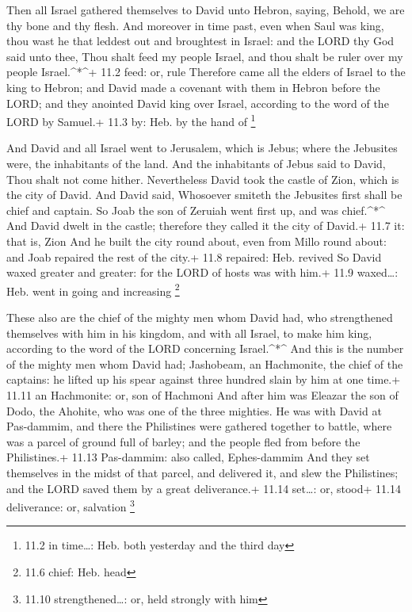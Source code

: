  Then all Israel gathered themselves to David unto Hebron,
saying, Behold, we are thy bone and thy flesh.  And moreover
in time past, even when Saul was king, thou wast he that leddest out and
broughtest in Israel: and the LORD thy God said unto thee, Thou shalt
feed my people Israel, and thou shalt be ruler over my people
Israel.\^{}*\^{}+ 11.2 feed: or, rule  Therefore came all
the elders of Israel to the king to Hebron; and David made a covenant
with them in Hebron before the LORD; and they anointed David king over
Israel, according to the word of the LORD by Samuel.+ 11.3 by: Heb. by
the hand of \footnote{11.2 in time\ldots: Heb. both yesterday and the
  third day}

 And David and all Israel went to Jerusalem, which is Jebus;
where the Jebusites were, the inhabitants of the land.  And
the inhabitants of Jebus said to David, Thou shalt not come hither.
Nevertheless David took the castle of Zion, which is the city of David.
 And David said, Whosoever smiteth the Jebusites first shall
be chief and captain. So Joab the son of Zeruiah went first up, and was
chief.\^{}*\^{}  And David dwelt in the castle; therefore
they called it the city of David.+ 11.7 it: that is, Zion 
And he built the city round about, even from Millo round about: and Joab
repaired the rest of the city.+ 11.8 repaired: Heb. revived 
So David waxed greater and greater: for the LORD of hosts was with him.+
11.9 waxed\ldots: Heb. went in going and increasing \footnote{11.6
  chief: Heb. head}

 These also are the chief of the mighty men whom David had,
who strengthened themselves with him in his kingdom, and with all
Israel, to make him king, according to the word of the LORD concerning
Israel.\^{}*\^{}  And this is the number of the mighty men
whom David had; Jashobeam, an Hachmonite, the chief of the captains: he
lifted up his spear against three hundred slain by him at one time.+
11.11 an Hachmonite: or, son of Hachmoni  And after him was
Eleazar the son of Dodo, the Ahohite, who was one of the three mighties.
 He was with David at Pas-dammim, and there the Philistines
were gathered together to battle, where was a parcel of ground full of
barley; and the people fled from before the Philistines.+ 11.13
Pas-dammim: also called, Ephes-dammim  And they set
themselves in the midst of that parcel, and delivered it, and slew the
Philistines; and the LORD saved them by a great deliverance.+ 11.14
set\ldots: or, stood+ 11.14 deliverance: or, salvation \footnote{11.10
  strengthened\ldots: or, held strongly with him}

